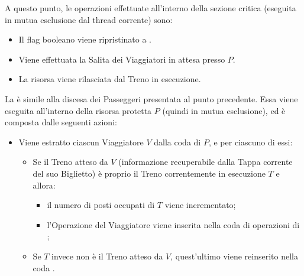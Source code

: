 \begin{description}
		A questo punto, le operazioni effettuate all'interno della sezione critica (eseguita in mutua esclusione dal thread corrente) sono:
		
			\begin{itemize}
				\item Il flag booleano  viene ripristinato a .
				\item Viene effettuata la Salita dei Viaggiatori in attesa presso $P$.
				\item La risorsa viene rilasciata dal Treno in esecuzione. 
			\end{itemize}
		
		La  è simile alla discesa dei Passeggeri presentata al punto precedente. Essa viene eseguita all'interno della risorsa protetta $P$ (quindi in mutua esclusione), ed è composta dalle seguenti azioni:
		\begin{itemize}
			\item Viene estratto ciascun Viaggiatore $V$ dalla coda  di $P$, e per ciascuno di essi:
			\begin{itemize}
				\item Se il Treno atteso da $V$ (informazione recuperabile dalla Tappa corrente del suo Biglietto) è proprio il Treno correntemente in esecuzione $T$ e  allora:
					\begin{itemize}
						\item il numero di posti occupati di $T$ viene incrementato;
						\item l'Operazione  del Viaggiatore viene inserita nella coda di operazioni di ;
					\end{itemize}
				\item Se $T$ invece non è il Treno atteso da $V$, quest'ultimo viene reinserito nella coda .
			\end {itemize}
		\end{itemize}
		
	\end {description}
	
		
